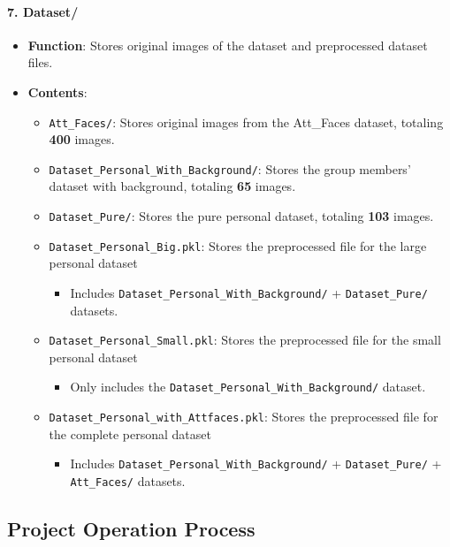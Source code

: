 \documentclass{article}
\begin{document}
\paragraph{7. Dataset/}
\begin{itemize}
    \item \textbf{Function}: Stores original images of the dataset and preprocessed dataset files.
    \item \textbf{Contents}:
    \begin{itemize}
        \item \texttt{Att\_Faces/}: Stores original images from the Att\_Faces dataset, totaling \textbf{400} images.
        \item \texttt{Dataset\_Personal\_With\_Background/}: Stores the group members' dataset with background, totaling \textbf{65} images.
        \item \texttt{Dataset\_Pure/}: Stores the pure personal dataset, totaling \textbf{103} images.
        \item \texttt{Dataset\_Personal\_Big.pkl}: Stores the preprocessed file for the large personal dataset
        \begin{itemize}
            \item Includes \texttt{Dataset\_Personal\_With\_Background/} + \texttt{Dataset\_Pure/} datasets.
        \end{itemize}
            \item \texttt{Dataset\_Personal\_Small.pkl}: Stores the preprocessed file for the small personal dataset
        \begin{itemize}
            \item Only includes the \texttt{Dataset\_Personal\_With\_Background/} dataset.
        \end{itemize}
        \item \texttt{Dataset\_Personal\_with\_Attfaces.pkl}: Stores the preprocessed file for the complete personal dataset
        \begin{itemize}
            \item Includes \texttt{Dataset\_Personal\_With\_Background/} + \texttt{Dataset\_Pure/} + \texttt{Att\_Faces/} datasets.
        \end{itemize}
    \end{itemize}
\end{itemize}

\subsection{Project Operation Process}
\end{document}
